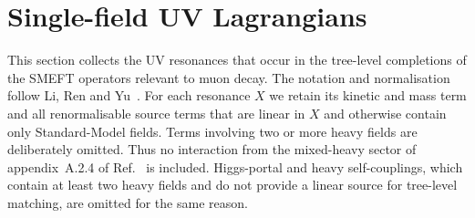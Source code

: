 
\section{Single-field UV Lagrangians}
\label{sec:single-field-uv-lagrangians}

This section collects the UV resonances that occur in the tree-level
completions of the SMEFT operators relevant to muon decay.  The notation and
normalisation follow Li, Ren and Yu~\cite{li2024complete}.  For each resonance
$X$ we retain its kinetic and mass term and all renormalisable source terms
that are linear in $X$ and otherwise contain only Standard-Model fields.
Terms involving two or more heavy fields are deliberately omitted.  Thus no
interaction from the mixed-heavy sector of appendix~A.2.4 of
Ref.~\cite{li2024complete} is included.  Higgs-portal and heavy self-couplings,
which contain at least two heavy fields and do not provide a linear source for
tree-level matching, are omitted for the same reason.

